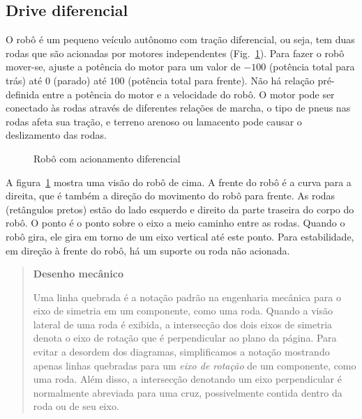 \subsection{Drive diferencial}

O robô é um pequeno veículo autônomo com tração diferencial, ou seja, tem duas rodas que são acionadas por motores independentes (Fig.~\ref{fig.differential}). Para fazer o robô mover-se, ajuste a potência do motor para um valor de $-100$ (potência total para trás) até $0$ (parado) até $100$ (potência total para frente). Não há relação pré-definida entre a potência do motor e a velocidade do robô. O motor pode ser conectado às rodas através de diferentes relações de marcha, o tipo de pneus nas rodas afeta sua tração, e terreno arenoso ou lamacento pode causar o deslizamento das rodas.

\begin{figure}
\begin{center}
\end{center}
\caption{Robô com acionamento diferencial\label{fig.differential}}
\end{figure}

A figura~\ref{fig.differential} mostra uma visão do robô de cima. A frente do robô é a curva para a direita, que é também a direção do movimento do robô para frente. As rodas (retângulos pretos) estão do lado esquerdo e direito da parte traseira do corpo do robô. O ponto é o ponto sobre o eixo a meio caminho entre as rodas. Quando o robô gira, ele gira em torno de um eixo vertical até este ponto. Para estabilidade, em direção à frente do robô, há um suporte ou roda não acionada.

\begin{quote}
\begin{center}
\textbf{Desenho mecânico}
\end{center}
Uma linha quebrada é a notação padrão na engenharia mecânica para o eixo de simetria em um componente, como uma roda. Quando a visão lateral de uma roda é exibida, a intersecção dos dois eixos de simetria denota o eixo de rotação que é perpendicular ao plano da página. Para evitar a desordem dos diagramas, simplificamos a notação mostrando apenas linhas quebradas para um \emph{eixo de rotação} de um componente, como uma roda. Além disso, a intersecção denotando um eixo perpendicular é normalmente abreviada para uma cruz, possivelmente contida dentro da roda ou de seu eixo.
\end{quote}

